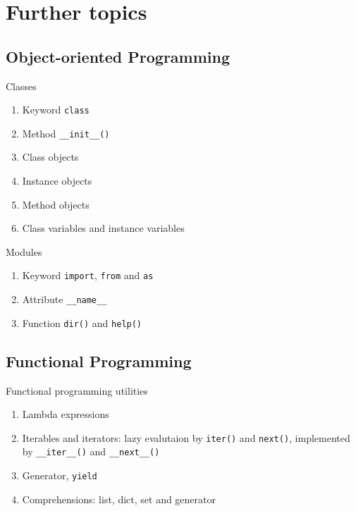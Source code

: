 \documentclass[english, nochinese]{pkuslide}
\begin{document}
\section{Further topics}

\begin{frame}
\sectionpage
\end{frame}

\subsection{Object-oriented Programming}

\begin{frame}
\sectionpage
\end{frame}

\begin{frame}[fragile]{Classes}
\begin{enumerate}
\item Keyword \verb"class"
\item Method \verb"__init__()"
\item Class objects
\item Instance objects
\item Method objects
\item Class variables and instance variables
\end{enumerate}
\end{frame}

\begin{frame}[fragile]{Modules}
\begin{enumerate}
\item Keyword \verb"import", \verb"from" and \verb"as"
\item Attribute \verb"__name__"
\item Function \verb"dir()" and \verb"help()"
\end{enumerate}
\end{frame}

\subsection{Functional Programming}

\begin{frame}[fragile]{Functional programming utilities}
\begin{enumerate}
\item Lambda expressions
\item Iterables and iterators: lazy evalutaion by \verb"iter()" and \verb"next()", implemented by \verb"__iter__()" and \verb"__next__()"
\item Generator, \verb"yield"
\item Comprehensions: list, dict, set and generator
\end{enumerate}
\end{frame}
\end{document}
